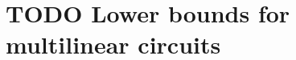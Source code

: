 \chapter{TODO Lower bounds for multilinear circuits}\label{chap:multilinear-circuits}

\cite{RSY08} \cite{KV17}
